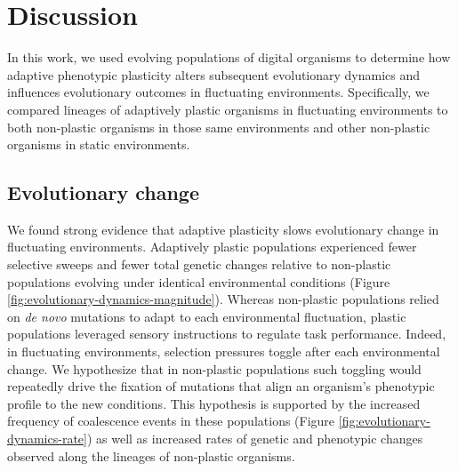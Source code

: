 
\section{Discussion}

In this work, we used evolving populations of digital organisms to determine how adaptive phenotypic plasticity alters subsequent evolutionary dynamics and influences evolutionary outcomes in fluctuating environments.
Specifically, we compared lineages of adaptively plastic organisms in fluctuating environments to both non-plastic organisms in those same environments and other non-plastic organisms in static environments.

\subsection{Evolutionary change}

We found strong evidence that adaptive plasticity slows evolutionary change in fluctuating environments. 
Adaptively plastic populations experienced fewer selective sweeps and fewer total genetic changes relative to non-plastic populations evolving under identical environmental conditions (Figure \ref{fig:evolutionary-dynamics-magnitude}).
Whereas non-plastic populations relied on \textit{de novo} mutations to adapt to each environmental fluctuation, plastic populations leveraged sensory instructions to regulate task performance. 
Indeed, in fluctuating environments, selection pressures toggle after each environmental change.
We hypothesize that in non-plastic populations such toggling would repeatedly drive the fixation of mutations that align an organism's phenotypic profile to the new conditions.
This hypothesis is supported by the increased frequency of coalescence events in these populations (Figure \ref{fig:evolutionary-dynamics-rate}) as well as increased rates of genetic and phenotypic changes observed along the lineages of non-plastic organisms. 


